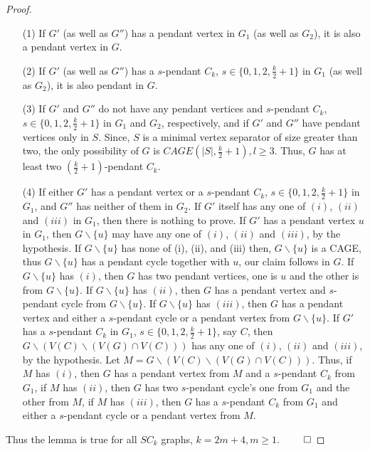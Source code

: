 \documentclass[runningheads]{llncs}
\begin{document}
\begin{proof}
\begin{itemize}
\item[(1)] If $G'$ (as well as $G''$) has a pendant vertex in $G_1$ (as well as $G_2$), it is also a pendant vertex in $G$.
\item[(2)] If $G'$ (as well as $G''$) has a $s$-pendant $C_k$, $s\in\{0,1,2,\frac{k}{2}+1\}$ in $G_1$ (as well as $G_2$), it is also pendant in $G$.
\item[(3)] If $G'$ and $G''$ do not have any pendant vertices and $s$-pendant $C_k$, $s \in \{0,1,2,\frac{k}{2}+1\}$ in $G_1$ and $G_2$, respectively, and if $G'$ and $G''$ have pendant vertices only in $S$. Since, $S$ is a minimal vertex separator of size greater than two, the only possibility of $G$ is $CAGE(\mid S \mid, \frac{k}{2}+1), l \geq 3$. Thus, $G$ has at least two $(\frac{k}{2}+1)$-pendant $C_k$.
\item[(4)] If either $G'$ has a pendant vertex or a $s$-pendant $C_k$, $s\in \{0,1,2,\frac{k}{2}+1\}$ in $G_1$, and $G''$ has neither of them in $G_2$. If $G'$ itself has any one of $(i)$, $(ii)$ and $(iii)$ in $G_1$, then there is nothing to prove. If $G'$ has a pendant vertex $u$ in $G_1$, then $G\backslash \{u\}$ may have any one of $(i)$, $(ii)$ and $(iii)$, by the hypothesis. If $G\backslash \{u\}$ has none of (i), (ii), and (iii) then, $G\backslash \{u\}$ is a CAGE, thus $G\backslash \{u\}$ has a pendant cycle together with $u$, our claim follows in $G$. If $G\backslash \{u\}$ has $(i)$, then $G$ has two pendant vertices, one is $u$ and the other is from $G\backslash \{u\}$. If $G\backslash \{u\}$ has $(ii)$, then $G$ has a pendant vertex and $s$-pendant cycle from $G\backslash \{u\}$. If $G\backslash \{u\}$ has $(iii)$, then $G$ has a pendant vertex and either a $s$-pendant cycle or a pendant vertex from $G\backslash \{u\}$. If $G'$ has a $s$-pendant $C_k$ in $G_1$, $s\in \{0,1,2,\frac{k}{2}+1\}$, say $C$, then $G\backslash (V(C)\backslash (V(G)\cap V(C)))$ has any one of $(i)$, $(ii)$ and $(iii)$, by the hypothesis. Let $M=G\backslash (V(C)\backslash (V(G)\cap V(C)))$. Thus, if $M$ has $(i)$, then $G$ has a pendant vertex from $M$ and a $s$-pendant $C_k$ from $G_1$, if $M$ has $(ii)$, then $G$ has two $s$-pendant cycle's one from $G_1$ and the other from $M$, if $M$ has $(iii)$, then $G$ has a $s$-pendant $C_k$ from $G_1$ and either a $s$-pendant cycle or a pendant vertex from $M$.
\end{itemize}


Thus the lemma is true for all $SC_k$ graphs, $k=2m+4, m \geq 1$. $\hfill \qed$

\end{proof}
\end{document}

